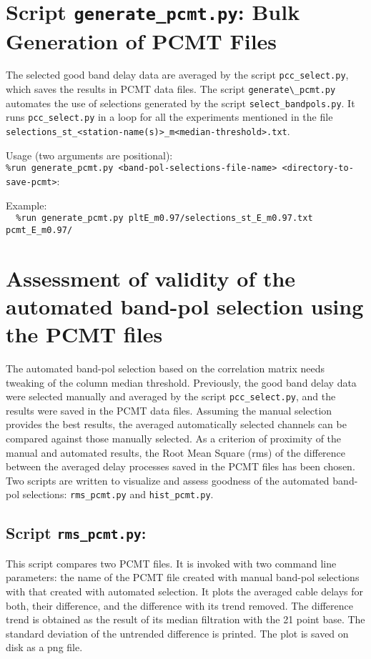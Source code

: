 \documentclass[preprint]{aastex}
\begin{document}
\section{Script \texttt{generate\_pcmt.py}: Bulk Generation of PCMT Files}

The selected good band delay data are averaged by the script \verb$pcc_select.py$, which saves the results in PCMT data files. The script \verb$generate\_pcmt.py$ automates the use of selections generated by the script \verb$select_bandpols.py$. It runs \verb$pcc_select.py$ in a loop for all the experiments mentioned in the file \verb$selections_st_<station-name(s)>_m<median-threshold>.txt$.

Usage (two arguments are positional): \\
\texttt{\%run generate\_pcmt.py   <band-pol-selections-file-name>  <directory-to-save-pcmt>}:

Example: \\
\verb$  %run generate_pcmt.py pltE_m0.97/selections_st_E_m0.97.txt pcmt_E_m0.97/$



\section{Assessment of validity of the automated band-pol selection using the PCMT files}

The automated band-pol selection based on the correlation matrix needs tweaking of the column median threshold. Previously, the good band delay data were selected manually and averaged by the script \verb$pcc_select.py$, and the results were saved in the PCMT data files. Assuming the manual selection provides the best results, the averaged automatically selected channels can be compared against those manually selected. As a criterion of proximity of the manual and automated results, the Root Mean Square (rms) of the difference between the averaged delay processes saved in the PCMT files has been chosen. Two scripts are written to visualize and assess goodness of the automated band-pol selections: \verb$rms_pcmt.py$ and \verb$hist_pcmt.py$.

\subsection{Script \texttt{rms\_pcmt.py}: }

This script compares two PCMT files. It is invoked with two command line parameters: the name of the PCMT file created with manual band-pol selections with that created with automated selection. It plots the averaged cable delays for both, their difference, and the difference with its trend removed. The difference trend is obtained as the result of its median filtration with the 21 point base. The standard deviation of the untrended difference is printed. The plot is saved on disk as a png file.
\end{document}
